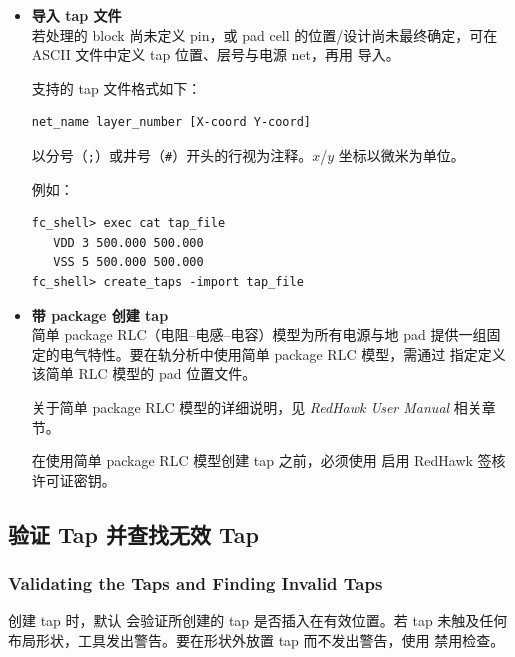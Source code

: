 \begin{itemize}
    下例在匹配 \texttt{*power\_pad\_cell*} 模式的所有单元实例的全部电源与地 pin 上创建 tap：
\begin{lstlisting}
fc_shell> create_taps -of_objects [get_cells -hier \
   *power_pad_cell*]
\end{lstlisting}

  \item \textbf{导入 tap 文件}\\
    若处理的 block 尚未定义 pin，或 pad cell 的位置/设计尚未最终确定，可在 ASCII 文件中定义 tap 位置、层号与电源 net，再用   导入。

    支持的 tap 文件格式如下：
\begin{lstlisting}
net_name layer_number [X-coord Y-coord]
\end{lstlisting}
    以分号（\texttt{;}）或井号（\texttt{\#}）开头的行视为注释。$x$/$y$ 坐标以微米为单位。

    例如：
\begin{lstlisting}
fc_shell> exec cat tap_file
   VDD 3 500.000 500.000
   VSS 5 500.000 500.000
fc_shell> create_taps -import tap_file
\end{lstlisting}

  \item \textbf{带 package 创建 tap}\\
    简单 package RLC（电阻--电感--电容）模型为所有电源与地 pad 提供一组固定的电气特性。要在轨分析中使用简单 package RLC 模型，需通过  指定定义该简单 RLC 模型的 pad 位置文件。

    关于简单 package RLC 模型的详细说明，见 \textit{RedHawk User Manual} 相关章节。

\begin{noteBox}
在使用简单 package RLC 模型创建 tap 之前，必须使用  启用 RedHawk 签核许可证密钥。
\end{noteBox}
\end{itemize}

\subsection{验证 Tap 并查找无效 Tap}
\subsubsection*{Validating the Taps and Finding Invalid Taps}

创建 tap 时，默认  会验证所创建的 tap 是否插入在有效位置。若 tap 未触及任何布局形状，工具发出警告。要在形状外放置 tap 而不发出警告，使用  禁用检查。

